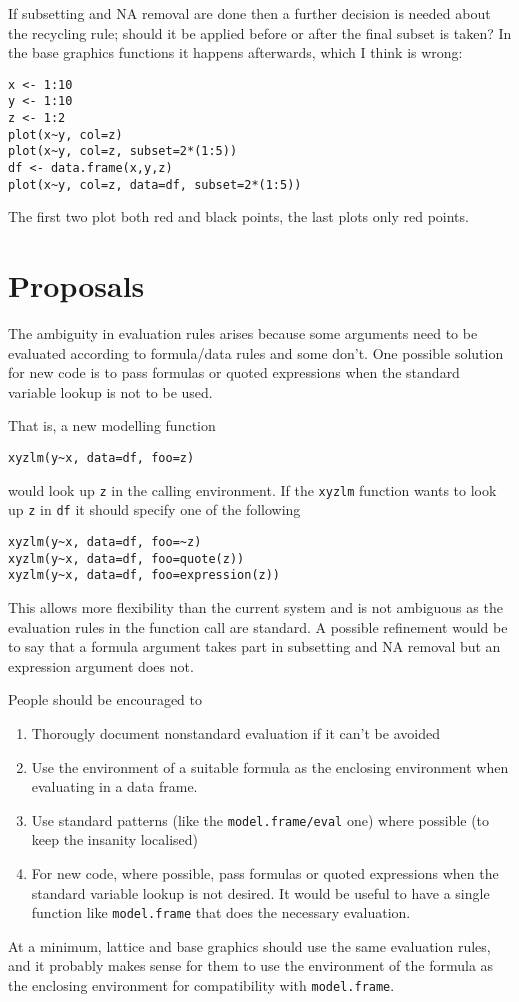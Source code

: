 \documentclass[11pt]{article}
\begin{document}
If subsetting and NA removal are done then a further decision is needed about the recycling rule; should it be applied before or after the final subset is taken?  In the base graphics functions it happens afterwards, which I think is wrong:
\begin{verbatim}
x <- 1:10
y <- 1:10
z <- 1:2
plot(x~y, col=z)                        
plot(x~y, col=z, subset=2*(1:5))  
df <- data.frame(x,y,z)
plot(x~y, col=z, data=df, subset=2*(1:5))
\end{verbatim}
The first two plot both red and black points, the last plots only red points.


\section{Proposals}
The ambiguity in evaluation rules arises because some arguments need to be evaluated according to formula/data rules and some don't.  One possible solution for new code is to pass formulas or quoted expressions when the standard variable lookup is not to be used.

That is, a new modelling function 
\begin{verbatim}
xyzlm(y~x, data=df, foo=z)
\end{verbatim}
would look up \verb=z= in the calling environment.  If the \texttt{xyzlm} function wants to look up  \verb=z= in \verb=df= it should specify one of the following
\begin{verbatim}
xyzlm(y~x, data=df, foo=~z)
xyzlm(y~x, data=df, foo=quote(z))
xyzlm(y~x, data=df, foo=expression(z))
\end{verbatim}
This allows more flexibility than the current system and is not ambiguous as the evaluation rules in the function call are standard.  A possible refinement would be to say that a formula argument takes part in subsetting and NA removal but an expression argument does not. 

People should be encouraged to 
\begin{enumerate}
\item Thorougly document nonstandard evaluation if it can't be avoided
\item Use the environment of a suitable formula as the enclosing environment when evaluating in a data frame.
\item Use standard patterns (like the  \verb=model.frame/eval= one) where possible  (to keep the insanity localised)
\item For new code, where possible, pass formulas or quoted expressions when the standard variable lookup is not desired. It would be useful to have a single function like \texttt{model.frame} that does the necessary evaluation.
\end{enumerate}

At a minimum, lattice and base graphics should use the same evaluation rules, and it probably makes sense for them to use the  environment of the formula as the enclosing environment for compatibility with \verb=model.frame=.

 
\end{document}
